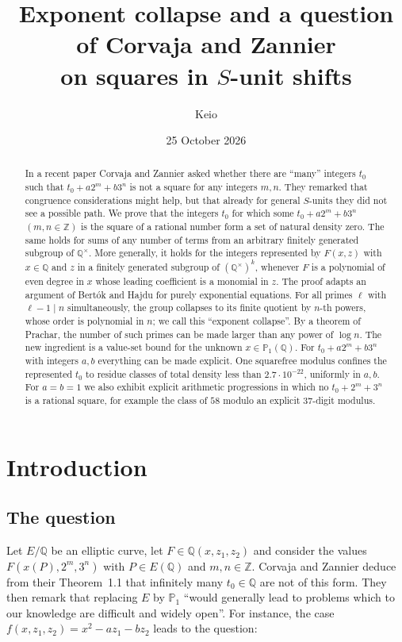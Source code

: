 \documentclass[11pt]{amsart}
\title[Squares in $S$-unit shifts]{Exponent collapse and a question of Corvaja and Zannier\\ on squares in $S$-unit shifts}
\author{Keio}
\date{25 October 2026}
\theoremstyle{definition}
\theoremstyle{remark}
\newcommand{\Z}{\mathbb{Z}}
\newcommand{\Q}{\mathbb{Q}}
\newcommand{\PP}{\mathbb{P}}
\begin{document}
\begin{abstract}
In a recent paper Corvaja and Zannier asked whether there are ``many'' integers $t_0$ such that $t_0+a2^m+b3^n$ is not a square for any integers $m,n$.
They remarked that congruence considerations might help, but that already for general $S$-units they did not see a possible path.
We prove that the integers $t_0$ for which some $t_0+a2^m+b3^n$ $(m,n\in\Z)$ is the square of a rational number form a set of natural density zero.
The same holds for sums of any number of terms from an arbitrary finitely generated subgroup of $\Q^\times$.
More generally, it holds for the integers represented by $F(x,z)$ with $x\in\Q$ and $z$ in a finitely generated subgroup of $(\Q^\times)^k$, whenever $F$ is a polynomial of even degree in $x$ whose leading coefficient is a monomial in $z$.
The proof adapts an argument of Bert\'ok and Hajdu for purely exponential equations.
For all primes $\ell$ with $\ell-1\mid n$ simultaneously, the group collapses to its finite quotient by $n$-th powers, whose order is polynomial in $n$; we call this ``exponent collapse''.
By a theorem of Prachar, the number of such primes can be made larger than any power of $\log n$.
The new ingredient is a value-set bound for the unknown $x\in\PP_1(\Q)$.
For $t_0+a2^m+b3^n$ with integers $a,b$ everything can be made explicit.
One squarefree modulus confines the represented $t_0$ to residue classes of total density less than $2.7\cdot10^{-22}$, uniformly in $a,b$.
For $a=b=1$ we also exhibit explicit arithmetic progressions in which no $t_0+2^m+3^n$ is a rational square, for example the class of $58$ modulo an explicit $37$-digit modulus.
\end{abstract}

\maketitle

\section{Introduction}

\subsection{The question}
Let $E/\Q$ be an elliptic curve, let $F\in\Q(x,z_1,z_2)$ and consider the values $F(x(P),2^m,3^n)$ with $P\in E(\Q)$ and $m,n\in\Z$.
Corvaja and Zannier \cite[Example~1.3]{CZ26} deduce from their Theorem~1.1 that infinitely many $t_0\in\Q$ are not of this form.
They then remark that replacing $E$ by $\PP_1$ ``would generally lead to problems which to our knowledge are difficult and widely open''.
For instance, the case $f(x,z_1,z_2)=x^2-az_1-bz_2$ leads to the question:
\end{document}
